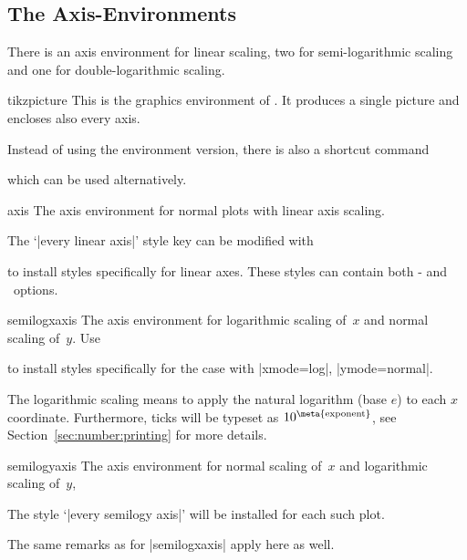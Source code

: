 

\subsection{The Axis-Environments}
There is an axis environment for linear scaling, two for semi-logarithmic scaling and one for double-logarithmic scaling.
\begin{environment}{{tikzpicture}}
	This is the graphics environment of \Tikz. It produces a single picture and encloses also every axis.

	Instead of using the environment version, there is also a shortcut command 

	\declareandlabel{\tikz}

	which can be used alternatively.
\end{environment}

\begin{environment}{{axis}}
	The axis environment for normal plots with linear axis scaling.

	The `|every linear axis|' style key can be modified with
\begin{codeexample}
\end{codeexample}
to install styles specifically for linear axes. These styles can contain both \Tikz- and \PGFPlots\ options.
\end{environment}

\begin{environment}{{semilogxaxis}}
The axis environment for logarithmic scaling of~$x$ and normal scaling of~$y$.
Use
\begin{codeexample}
\end{codeexample}
to install styles specifically for the case with |xmode=log|, |ymode=normal|.

The logarithmic scaling means to apply the natural logarithm (base $e$) to each $x$ coordinate. Furthermore, ticks will be typeset as $10^{\text{\meta{exponent}}}$, see Section~\ref{sec:number:printing} for more details.
\end{environment}

\begin{environment}{{semilogyaxis}}
The axis environment for normal scaling of~$x$ and logarithmic scaling of~$y$,

The style `|every semilogy axis|' will be installed for each such plot.

The same remarks as for |semilogxaxis| apply here as well.
\end{environment}

